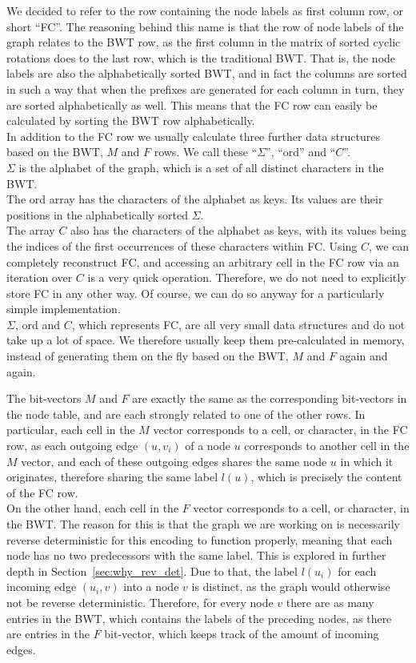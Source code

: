 \documentclass[a4paper,12pt,twoside,BCOR=10mm]{scrbook}
\begin{document}
We decided to refer to the row containing the node labels as first column row, or short “FC”.
The reasoning behind this name is that the row of node labels of the graph relates to the BWT row,
as the first column in the matrix of sorted cyclic rotations does to the last row, which is the traditional BWT.
That is, the node labels are also the alphabetically sorted BWT, and in fact the columns are sorted in such a
way that when the prefixes are generated for each column in turn, they are sorted alphabetically as well.
This means that the FC row can easily be calculated by sorting the BWT row alphabetically. \\
In addition to the FC row
we usually calculate three further data structures based
on the BWT, $ M $ and $ F $ rows.
We call these “$ \Sigma $”, “ord” and “$ C $”. \\
$ \Sigma $ is the alphabet of the graph, which is a set of all distinct characters in the BWT. \\
The ord array has the characters of the alphabet as keys.
Its values are their positions in the alphabetically sorted $ \Sigma $. \\
The array $ C $ also has the characters of the alphabet as keys,
with its values being the indices of the first occurrences of these characters within FC.
Using $ C $, we can completely reconstruct FC, and accessing an arbitrary cell in the FC row
via an iteration over $ C $ is a very quick operation.
Therefore, we do not need to explicitly store FC in any other way.
Of course, we can do so anyway for a particularly simple implementation. \\
$ \Sigma $, ord and $ C $, which represents FC, are all very small data structures and do not take up a lot of space.
We therefore usually keep them pre-calculated in memory,
instead of generating them on the fly based on the BWT, $ M $ and $ F $ again and again.

The bit-vectors $ M $ and $ F $ are exactly the same as the corresponding bit-vectors in the node table,
and are each strongly related to one of the other rows.
In particular, each cell in the $ M $ vector corresponds to a cell, or character, in the FC row,
as each outgoing edge $ (u, v_i) $ of a node $ u $ corresponds to another cell in the $ M $ vector, and each
of these outgoing edges shares the same node $ u $ in which it originates, therefore sharing the same label $ l ( u ) $,
which is precisely the content of the FC row. \\
On the other hand, each cell in the $ F $ vector corresponds to a cell, or character, in the BWT.
The reason for this is that the graph we are working on is necessarily reverse deterministic
for this encoding to function properly, meaning that each node has no two predecessors with the same label.
This is explored in further depth in Section~\ref{sec:why_rev_det}.
Due to that, the label $ l (u_i) $ for each incoming edge $ (u_i, v) $ into a node $ v $ is distinct,
as the graph would otherwise not be reverse deterministic.
Therefore, for every node $ v $ there are as many entries in the BWT, which contains the labels of the preceding nodes,
as there are entries in the $ F $ bit-vector, which keeps track of the amount of incoming edges.
\end{document}
